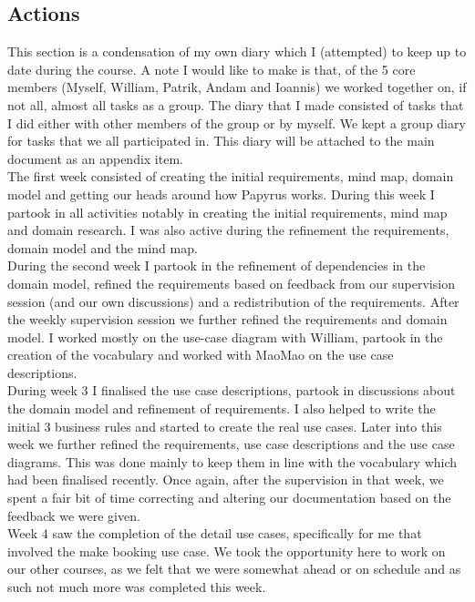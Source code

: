 \documentclass{article}
\begin{document}
\subsection*{Actions}
This section is a condensation of my own diary which I (attempted) to keep up to date during the course. A note I would like to make is that, of the 5 core members (Myself, William, Patrik, Andam and Ioannis) we worked together on, if not all, almost all tasks as a group. The diary that I made consisted of tasks that I did either with other members of the group or by myself. We kept a group diary for tasks that we all participated in. This diary will be attached to the main document as an appendix item.
\\

The first week consisted of creating the initial requirements, mind map, domain model and getting our heads around how Papyrus works. During this week I partook in all activities notably in creating the initial requirements, mind map and domain research. I was also active during the refinement the requirements, domain model and the mind map.
\\

During the second week I partook in the refinement of dependencies in the domain model, refined the requirements based on feedback from our supervision session (and our own discussions) and a redistribution of the requirements. After the weekly supervision session we further refined the requirements and domain model. I worked mostly on the use-case diagram with William, partook in the creation of the vocabulary and worked with MaoMao on the use case descriptions.
\\

During week 3 I finalised the use case descriptions, partook in discussions about the domain model and refinement of requirements. I also helped to write the initial 3 business rules and started to create the real use cases. Later into this week we further refined the requirements, use case descriptions and the use case diagrams. This was done mainly to keep them in line with the vocabulary which had been finalised recently. Once again, after the supervision in that week, we spent a fair bit of time correcting and altering our documentation based on the feedback we were given.
\\

Week 4 saw the completion of the detail use cases, specifically for me that involved the make booking use case. We took the opportunity here to work on our other courses, as we felt that we were somewhat ahead or on schedule and as such not much more was completed this week.
\\
\end{document}
